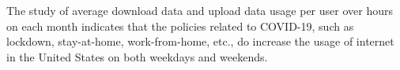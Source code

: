 The study of average download data and upload data usage per user over hours on each month indicates that the policies related to COVID-19, such as lockdown, stay-at-home, work-from-home, etc., do increase the usage of internet in the United States on both weekdays and weekends. 